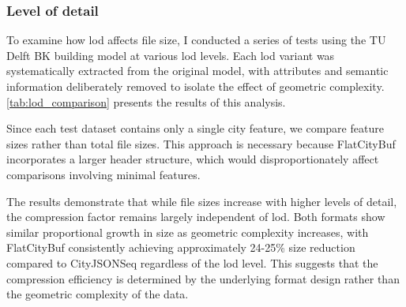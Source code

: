 \subsubsection{Level of detail}
\label{result:overview:analysis_of_file_size_results:level_of_detail}

To examine how \ac{lod} affects file size, I conducted a series of tests using the TU Delft BK building model at various \ac{lod} levels. Each \ac{lod} variant was systematically extracted from the original model, with attributes and semantic information deliberately removed to isolate the effect of geometric complexity. \autoref{tab:lod_comparison} presents the results of this analysis.

Since each test dataset contains only a single city feature, we compare feature sizes rather than total file sizes. This approach is necessary because FlatCityBuf incorporates a larger header structure, which would disproportionately affect comparisons involving minimal features.

The results demonstrate that while file sizes increase with higher levels of detail, the compression factor remains largely independent of \ac{lod}. Both formats show similar proportional growth in size as geometric complexity increases, with FlatCityBuf consistently achieving approximately 24-25\% size reduction compared to CityJSONSeq regardless of the \ac{lod} level. This suggests that the compression efficiency is determined by the underlying format design rather than the geometric complexity of the data.

